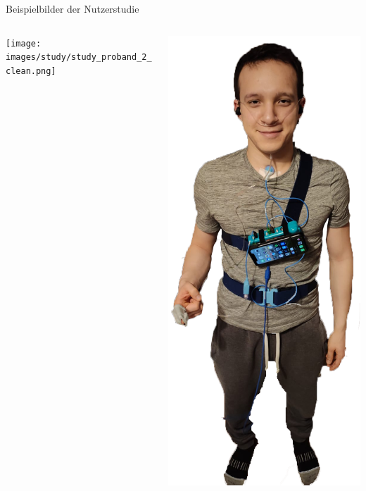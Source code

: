 \documentclass[18pt]{beamer}
\begin{document}
\begin{frame}{Beispielbilder der Nutzerstudie}
    \begin{center}
        \begin{columns}[T]
            \begin{column}{.49\textwidth}
                \centering
                \texttt{[image: images/study/study\_proband\_2\_clean.png]}
            \end{column}
            \hfill%
            \begin{column}{.49\textwidth}
                \centering
                \includegraphics[scale=0.12]{images/study/study_proband_clean2.png}
            \end{column}
        \end{columns}
    \end{center}
\end{frame}
\end{document}
